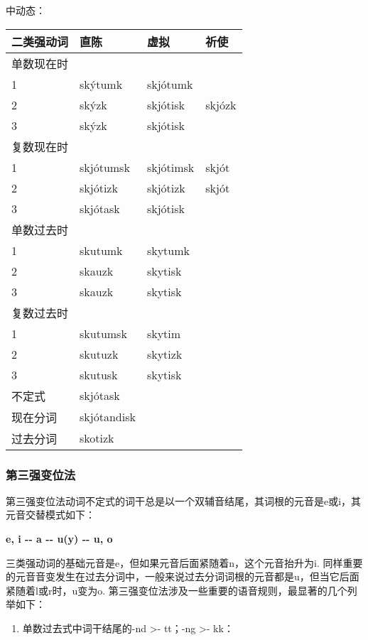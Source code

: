中动态：

\begin{longtable}{llll}
\toprule
二类强动词 & 直陈 & 虚拟 & 祈使 \\
\midrule
\endhead
\bottomrule
\endfoot
单数现在时 & & & \\
1 & skýtumk & skjótumk & \\
2 & skýzk & skjótisk & skjózk \\
3 & skýzk & skjótisk & \\
复数现在时 & & & \\
1 & skjótumsk & skjótimsk & skjót \\
2 & skjótizk & skjótizk & skjót \\
3 & skjótask & skjótisk & \\
单数过去时 & & & \\
1 & skutumk & skytumk & \\
2 & skauzk & skytisk & \\
3 & skauzk & skytisk & \\
复数过去时 & & & \\
1 & skutumsk & skytim & \\
2 & skutuzk & skytizk & \\
3 & skutusk & skytisk & \\
不定式 & skjótask & & \\
现在分词 & skjótandisk & & \\
过去分词 & skotizk & & \\
\end{longtable}

\subsubsection{第三强变位法}\label{ux7b2cux4e09ux5f3aux53d8ux4f4dux6cd5}

第三强变位法动词不定式的词干总是以一个双辅音结尾，其词根的元音是e或i，其元音交替模式如下：

\textbf{e, i -\/- a -\/- u(y) -\/- u, o}

三类强动词的基础元音是e，但如果元音后面紧随着n，这个元音抬升为i.
同样重要的元音音变发生在过去分词中，一般来说过去分词词根的元音都是u，但当它后面紧随着l或r时，u变为o.
第三强变位法涉及一些重要的语音规则，最显著的几个列举如下：

\begin{enumerate}
\def\labelenumi{\arabic{enumi})}
\item
  单数过去式中词干结尾的-nd \textgreater- tt；-ng \textgreater- kk：
\end{enumerate}

